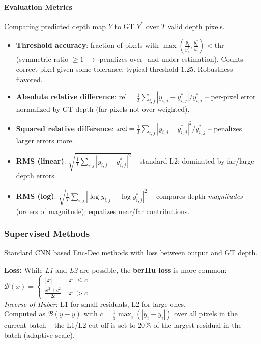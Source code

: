 \documentclass{article}
\begin{document}
\paragraph{Evaluation Metrics}
Comparing predicted depth map $Y$ to GT $Y^*$ over $T$ valid depth pixels.
\begin{itemize}
    \item \textbf{Threshold accuracy}: fraction of pixels with $\max\!\left(\frac{y_i}{y_i^*}, \frac{y_i^*}{y_i}\right) < \text{thr}$ (symmetric ratio $\geq 1$ $\rightarrow$ penalizes over- and under-estimation). Counts correct pixel given some tolerance; typical threshold $1.25$. Robustness-flavored.
    \item \textbf{Absolute relative difference}: $\text{rel} = \frac{1}{T}\sum_{i,j}|y_{i,j} - y_{i,j}^*|/y_{i,j}^*$ -- per-pixel error normalized by GT depth (far pixels not over-weighted).
    \item \textbf{Squared relative difference}: $\text{srel} = \frac{1}{T}\sum_{i,j}|y_{i,j} - y_{i,j}^*|^2/y_{i,j}^*$ -- penalizes larger errors more.
    \item \textbf{RMS (linear)}: $\sqrt{\frac{1}{T}\sum_{i,j}|y_{i,j} - y_{i,j}^*|^2}$ -- standard L2; dominated by far/large-depth errors.
    \item \textbf{RMS (log)}: $\sqrt{\frac{1}{T}\sum_{i,j}|\log y_{i,j} - \log y_{i,j}^*|^2}$ -- compares depth \textit{magnitudes} (orders of magnitude); equalizes near/far contributions.
\end{itemize}

\subsubsection{Supervised Methods}
Standard CNN based Enc-Dec methods with loss between output and GT depth.

\textbf{Loss:} While \textit{L1} and \textit{L2} are possible, the \textbf{berHu loss} is more common:
$\mathcal{B}(x) = \begin{cases} |x| & |x| \leq c \\ \frac{x^2 + c^2}{2c} & |x| > c \end{cases}$\\
\textit{Inverse of Huber}: L1 for small residuals, L2 for large ones. \\

Computed as $\mathcal{B}(\tilde y - y)$ with $c = \tfrac{1}{5}\max_i(|\tilde y_i - y_i|)$ over all pixels in the current batch -- the L1/L2 cut-off is set to $20\%$ of the largest residual in the batch (adaptive scale).
\end{document}
